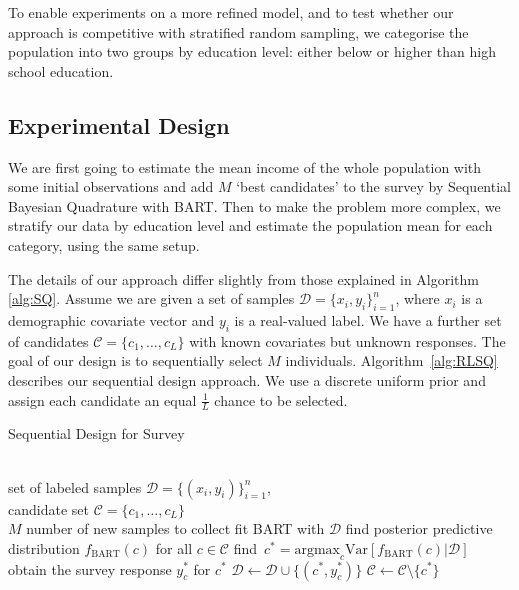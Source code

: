 To enable experiments on a more refined model, and to test whether our approach is competitive with stratified random sampling, we categorise the population into two groups by education level: either below or higher than high school education.  

\subsection{Experimental Design}

We are first going to estimate the mean income of the whole population with some initial observations and add $M$ `best candidates' to the survey by Sequential Bayesian Quadrature with BART. Then to make the problem more complex, we stratify our data by education level and estimate the population mean for each category, using the same setup.

The details of our approach differ slightly from those explained in Algorithm \ref{alg:SQ}. Assume we are given a set of samples $\mathcal{D} = \{x_i,y_i\}_{i=1}^n$, where $x_i$ is a demographic covariate vector and $y_i$ is a real-valued label. We have a further set of candidates $\mathcal{C} = \{c_1, \ldots, c_L\}$ with known covariates but unknown responses. The goal of our design is to sequentially select $M$ individuals. Algorithm~\ref{alg:RLSQ} describes our sequential design approach. We use a discrete uniform prior and assign each candidate an equal $\frac{1}{L}$ chance to be selected. 
\begin{algorithm}[tbh!]
  \caption{Sequential Design for Survey}
  \label{alg:RLSQ}
\begin{algorithmic}
   \\set of labeled samples $\mathcal{D} = \{(x_i, y_i)\}_{i=1}^n$,  \\candidate set $\mathcal{C} = \{c_1, \ldots, c_L\}$ \\
  $M$ number of new samples to collect
  \STATE fit BART with $\mathcal{D}$
  \STATE find posterior predictive distribution $f_{\mbox{BART}}(c)$ for all $c\in\mathcal{C}$
  \STATE find $\,c^* = \mbox{argmax}_{c} \mbox{Var}[f_{\mbox{BART}}(c)|\mathcal{D}]$
	\label{eq:maxvar}
  \STATE obtain the survey response $y_c^*$ for $c^*$
  \STATE $\mathcal{D} \leftarrow \mathcal{D}\cup \{(c^*,y^*_c)\}$
  \STATE $\mathcal{C} \leftarrow \mathcal{C}\setminus \{c^*\}$
\ENDFOR
\end{algorithmic}
\end{algorithm}

